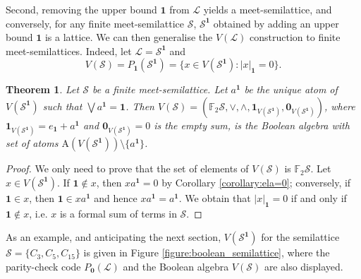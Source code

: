 \documentclass[a4paper, 11pt]{article}
\theoremstyle{plain}
\newtheorem{theorem}{Theorem}[section]
\theoremstyle{definition}
\newcommand{\F} {\mathbb{F}}
\newcommand{\join}      {\lor}
\newcommand{\meet}      {\land}
\newcommand{\bigjoin}   {\bigvee}
\newcommand{\zero}      {\mathbf{0}}
\newcommand{\one}       {\mathbf{1}}
\newcommand{\Atoms}     {\mathrm{A}}
\begin{document}
Second, removing the upper bound $\one$ from $\mathcal{L}$ yields a meet-semilattice, and conversely, for any finite meet-semilattice $\mathcal{S}$, $\mathcal{S}^\one$ obtained by adding an upper bound $\one$ is a lattice. We can then generalise the $V( \mathcal{L} )$ construction to finite meet-semilattices. Indeed, let $\mathcal{L} = \mathcal{S}^\one$ and
\[
    V( \mathcal{S} ) = P_\one( \mathcal{S}^\one ) = \{ x \in V( \mathcal{S}^\one ) : |x|_\one = 0 \}.
\]




\begin{theorem} \label{theorem:VS}
Let $\mathcal{S}$ be a finite meet-semilattice. Let $a^\one$ be the unique atom of $V( \mathcal{S}^\one )$ such that $\bigjoin a^\one = \one$. Then $V( \mathcal{S} ) = ( \F_2\mathcal{S}, \join, \meet, \one_{ V( \mathcal{S}^\one ) }, \zero_{ V( \mathcal{S}^\one ) } )$, where $\one_{ V( \mathcal{S}^\one ) } = e_\one + a^\one$ and $\zero_{ V( \mathcal{S}^\one ) } = 0$ is the empty sum, is the Boolean algebra with set of atoms $\Atoms( V( \mathcal{S}^\one ) ) \setminus \{ a^\one \}$.
\end{theorem}

\begin{proof}
We only need to prove that the set of elements of $V( \mathcal{S} )$ is $\F_2 \mathcal{S}$. Let $x \in V( \mathcal{S}^\one )$. If $\one \notin x$, then $x a^\one = 0$ by Corollary \ref{corollary:ela=0}; conversely, if $\one \in x$, then $\one \in x a^\one$ and hence $x a^\one = a^\one$. We obtain that $|x|_\one = 0$ if and only if $\one \notin x$, i.e. $x$ is a formal sum of terms in $\mathcal{S}$.
\end{proof}


As an example, and anticipating the next section, $V( \mathcal{S}^\one )$ for the semilattice $\mathcal{S} = \{ C_3, C_5, C_{15} \}$ is given in Figure \ref{figure:boolean_semilattice}, where the parity-check code $P_\zero( \mathcal{L} )$ and the Boolean algebra $V( \mathcal{S} )$ are also displayed.
\end{document}
